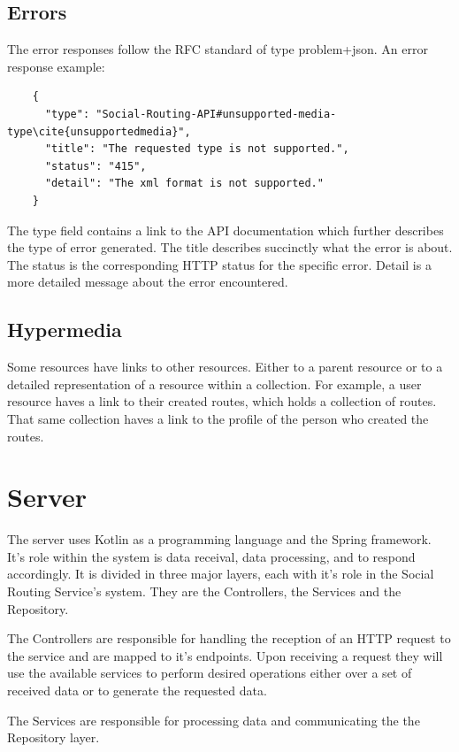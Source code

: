     \subsection{Errors}
    The error responses follow the RFC standard of type problem+json\cite{jsonproblemonlinedocs}. An error response example:
    
    \begin{lstlisting}
    {
      "type": "Social-Routing-API#unsupported-media-type\cite{unsupportedmedia}",
      "title": "The requested type is not supported.",
      "status": "415",
      "detail": "The xml format is not supported."
    }
    \end{lstlisting}

    The type field contains a link to the API documentation which further describes the type of error generated.
    The title describes succinctly what the error is about.
    The status is the corresponding HTTP status for the specific error.
    Detail is a more detailed message about the error encountered.

    \subsection*{Hypermedia}
    Some resources have links to other resources. Either to a parent resource or to a detailed representation of a 
    resource within a collection. For example, a user resource haves a link to their created routes, which 
    holds a collection of routes. That same collection haves a link to the profile of the person who created 
    the routes.
    \newpage

\section{Server} 
The server uses Kotlin as a programming language and the Spring framework\cite{springwebsite}. 
It's role within the system is data receival, data processing, 
and to respond accordingly. It is divided in three major layers, each with it's role in the Social Routing Service's system. 
They are the Controllers, the Services and the Repository.

The Controllers are responsible for handling the reception of an HTTP request to the service and are mapped to
it's endpoints. Upon receiving a request they will use the available services to perform desired operations either
over a set of received data or to generate the requested data.

The Services are responsible for processing data and communicating the the Repository layer.

